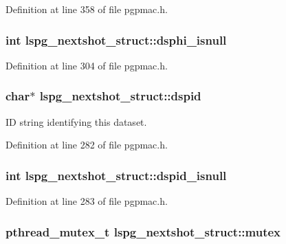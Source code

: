 Definition at line 358 of file pgpmac.\-h.

\hypertarget{structlspg__nextshot__struct_a2d1f51cb1bb575a214344773136be878}{
\subsubsection[{dsphi\-\_\-isnull}]{\setlength{\rightskip}{0pt plus 5cm}int lspg\-\_\-nextshot\-\_\-struct\-::dsphi\-\_\-isnull}}\label{structlspg__nextshot__struct_a2d1f51cb1bb575a214344773136be878}


Definition at line 304 of file pgpmac.\-h.

\hypertarget{structlspg__nextshot__struct_a4487e718c2b55a8ab9ebb18329574ae1}{
\subsubsection[{dspid}]{\setlength{\rightskip}{0pt plus 5cm}char$\ast$ lspg\-\_\-nextshot\-\_\-struct\-::dspid}}\label{structlspg__nextshot__struct_a4487e718c2b55a8ab9ebb18329574ae1}


I\-D string identifying this dataset. 



Definition at line 282 of file pgpmac.\-h.

\hypertarget{structlspg__nextshot__struct_a7665485395487756ab448d0c81c84d10}{
\subsubsection[{dspid\-\_\-isnull}]{\setlength{\rightskip}{0pt plus 5cm}int lspg\-\_\-nextshot\-\_\-struct\-::dspid\-\_\-isnull}}\label{structlspg__nextshot__struct_a7665485395487756ab448d0c81c84d10}


Definition at line 283 of file pgpmac.\-h.

\hypertarget{structlspg__nextshot__struct_a38b657155fbee9b73278f76912cf2333}{
\subsubsection[{mutex}]{\setlength{\rightskip}{0pt plus 5cm}pthread\-\_\-mutex\-\_\-t lspg\-\_\-nextshot\-\_\-struct\-::mutex}}\label{structlspg__nextshot__struct_a38b657155fbee9b73278f76912cf2333}


